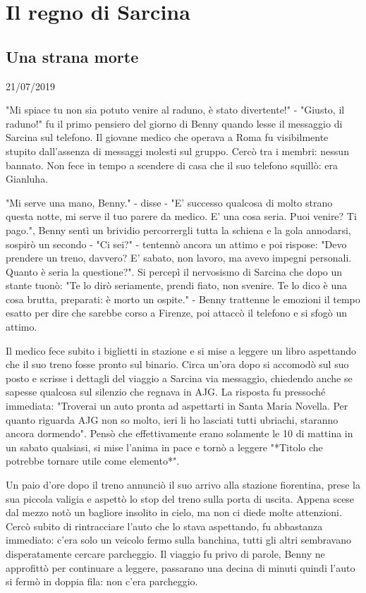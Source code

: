\chapter{Il regno di Sarcina}
\section{Una strana morte}
21/07/2019


"Mi spiace tu non sia potuto venire al raduno, è stato divertente!" - "Giusto, il raduno!" fu il primo pensiero del giorno di Benny quando lesse il messaggio di Sarcina sul telefono. Il giovane medico che operava a Roma fu visibilmente stupito dall'assenza di messaggi molesti sul gruppo. Cercò tra i membri: nessun bannato. Non fece in tempo a scendere di casa che il suo telefono squillò: era Gianluha.

"Mi serve una mano, Benny." - disse - "E' successo qualcosa di molto strano questa notte, mi serve il tuo parere da medico. E' una cosa seria. Puoi venire? Ti pago.", Benny sentì un brividio percorrergli tutta la schiena e la gola annodarsi, sospirò un secondo - "Ci sei?" - tentennò ancora un attimo e poi rispose: "Devo prendere un treno, davvero? E' sabato, non lavoro, ma avevo impegni personali. Quanto è seria la questione?". 
Si percepì il nervosismo di Sarcina che dopo un stante tuonò: "Te lo dirò seriamente, prendi fiato, non svenire. Te lo dico è una cosa brutta, preparati: è morto un ospite." - Benny trattenne le emozioni il tempo esatto per dire che sarebbe corso a Firenze, poi attaccò il telefono e si sfogò un attimo.

Il medico fece subito i biglietti in stazione e si mise a leggere un libro aspettando che il suo treno fosse pronto sul binario. Circa un'ora dopo si accomodò sul suo posto e scrisse i dettagli del viaggio a Sarcina via messaggio, chiedendo anche se sapesse qualcosa sul silenzio che regnava in AJG.
La risposta fu pressoché immediata: "Troverai un auto pronta ad aspettarti in Santa Maria Novella. Per quanto riguarda AJG non so molto, ieri li ho lasciati tutti ubriachi, staranno ancora dormendo".
Pensò che effettivamente erano solamente le 10 di mattina in un sabato qualsiasi, si mise l'anima in pace e tornò a leggere "*Titolo che potrebbe tornare utile come elemento*".

Un paio d'ore dopo il treno annunciò il suo arrivo alla stazione fiorentina, prese la sua piccola valigia e aspettò lo stop del treno sulla porta di uscita. Appena scese dal mezzo notò un bagliore insolito in cielo, ma non ci diede molte attenzioni. Cercò subito di rintracciare l'auto che lo stava aspettando, fu abbastanza immediato: c'era solo un veicolo fermo sulla banchina, tutti gli altri sembravano disperatamente cercare parcheggio.
Il viaggio fu privo di parole, Benny ne approfittò per continuare a leggere, passarano una decina di minuti quindi l'auto si fermò in doppia fila: non c'era parcheggio. 

